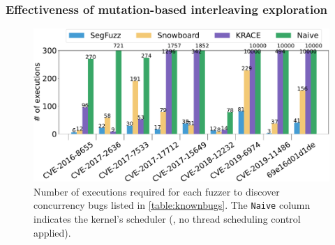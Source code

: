 %




%






\subsubsection{Effectiveness of mutation-based interleaving
  exploration}
\label{sss:interleavingsearch}
%
%
%   

\begin{figure}[t]
  \centering
  \includegraphics[width=0.99\linewidth]{fig/comparison_graph_execution-crop.pdf}
  \caption{Number of executions required for each fuzzer to discover
    concurrency bugs listed in \autoref{table:knownbugs}. The
    \texttt{Naive} column indicates the kernel's scheduler (\ie, no
    thread scheduling control applied).}
  \label{fig:eval:comparison-execution}
  \vspace{-8pt}
\end{figure}

